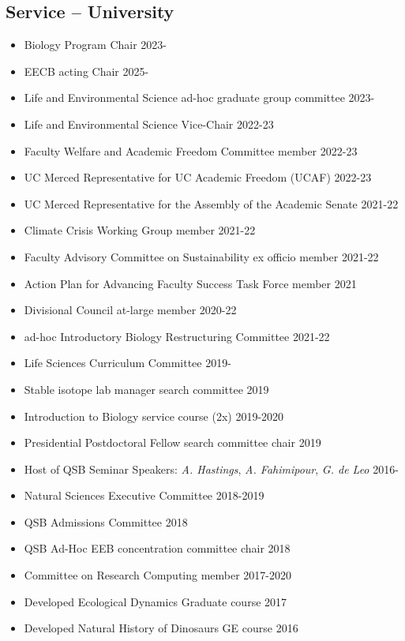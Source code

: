 \documentclass[margin,line,12pt]{res}
\begin{document}
\begin{resume}
\section{\sc Service -- University}
\begin{itemize}
  \item Biology Program Chair \hfill 2023-
  \item EECB acting Chair \hfill 2025-
  \item Life and Environmental Science ad-hoc graduate group committee \hfill 2023-
  \item Life and Environmental Science Vice-Chair \hfill 2022-23
  \item Faculty Welfare and Academic Freedom Committee member \hfill 2022-23
  \item UC Merced Representative for UC Academic Freedom (UCAF) \hfill 2022-23
  \item UC Merced Representative for the Assembly of the Academic Senate \hfill 2021-22
  \item Climate Crisis Working Group member \hfill 2021-22
  \item Faculty Advisory Committee on Sustainability ex officio member \hfill 2021-22
  \item Action Plan for Advancing Faculty Success Task Force member \hfill 2021
  \item Divisional Council at-large member \hfill 2020-22
  \item ad-hoc Introductory Biology Restructuring Committee \hfill 2021-22
	\item Life Sciences Curriculum Committee \hfill 2019-
	\item Stable isotope lab manager search committee \hfill 2019
	\item Introduction to Biology service course (2x) \hfill 2019-2020
	\item Presidential Postdoctoral Fellow search committee chair \hfill 2019
  \item Host of QSB Seminar Speakers: \emph{A. Hastings}, \emph{A. Fahimipour}, \emph{G. de Leo} \hfill 2016-
	\item Natural Sciences Executive Committee \hfill 2018-2019
	\item QSB Admissions Committee \hfill 2018
	\item QSB Ad-Hoc EEB concentration committee chair \hfill 2018
	\item Committee on Research Computing member \hfill 2017-2020
	\item Developed Ecological Dynamics Graduate course \hfill 2017
	\item Developed Natural History of Dinosaurs GE course \hfill 2016


\end{itemize}
\end{resume}
\end{document}
